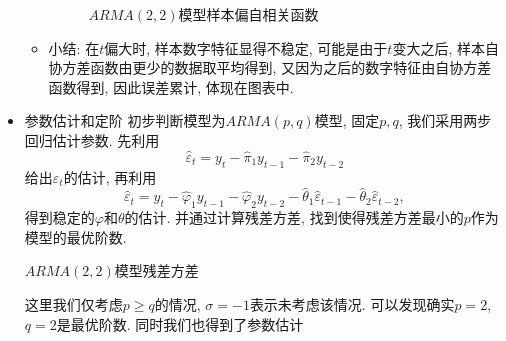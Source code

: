 \documentclass[chinese, lineno, watermark]{assignment}
\begin{document}
\begin{solution}
\begin{itemize}
\begin{itemize}
\begin{figure}[H]
                    \caption{$ARMA(2, 2)$模型样本偏自相关函数}
                \end{figure}
                \item 小结: 在$t$偏大时, 样本数字特征显得不稳定, 可能是由于$t$变大之后, 样本自协方差函数由更少的数据取平均得到, 又因为之后的数字特征由自协方差函数得到, 因此误差累计, 体现在图表中.
            \end{itemize}
            \item{参数估计和定阶}
            初步判断模型为$ARMA(p, q)$模型, 固定$p, q$, 我们采用两步回归估计参数. 先利用
            \begin{equation}
                \hat{\varepsilon}_{t} = y_{t}-\hat{\pi}_{1}y_{t-1}-\hat{\pi}_{2}y_{t-2}
            \end{equation}
            给出$\varepsilon_{t}$的估计, 再利用
            \begin{equation}
                \hat{\varepsilon}_{t}=y_{t}-\hat{\varphi}_{1}y_{t-1}-\hat{\varphi}_{2}y_{t-2}-\hat{\theta}_{1}\hat{\varepsilon}_{t-1}-\hat{\theta}_{2}\hat{\varepsilon}_{t-2},
            \end{equation}
            得到稳定的$\varphi$和$\theta$的估计.
            并通过计算残差方差, 找到使得残差方差最小的$p$作为模型的最优阶数.
            \begin{table}[H]
                \begin{center}
                    \caption{$ARMA(2, 2)$模型残差方差}
                \end{center}
            \end{table}
            这里我们仅考虑$p\geq q$的情况, $\sigma=-1$表示未考虑该情况. 可以发现确实$p=2$, $q=2$是最优阶数.
            同时我们也得到了参数估计
            \begin{table}[H]
                \begin{center}

\end{center}
\end{table}
\end{itemize}
\end{solution}
\end{document}
